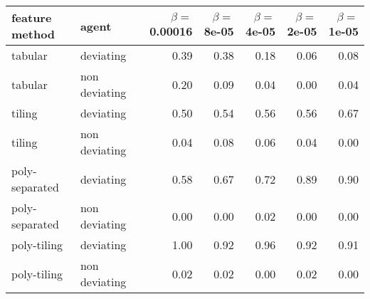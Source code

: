 \begin{tabular}{llrrrrr}
  \hline
feature method & agent & $\beta =$ 0.00016 & $\beta =$ 8e-05 & $\beta =$ 4e-05 & $\beta =$ 2e-05 & $\beta =$ 1e-05 \\ 
  \hline
tabular & deviating & 0.39 & 0.38 & 0.18 & 0.06 & 0.08 \\ 
  tabular & non deviating & 0.20 & 0.09 & 0.04 & 0.00 & 0.04 \\ 
  tiling & deviating & 0.50 & 0.54 & 0.56 & 0.56 & 0.67 \\ 
  tiling & non deviating & 0.04 & 0.08 & 0.06 & 0.04 & 0.00 \\ 
  poly-separated & deviating & 0.58 & 0.67 & 0.72 & 0.89 & 0.90 \\ 
  poly-separated & non deviating & 0.00 & 0.00 & 0.02 & 0.00 & 0.00 \\ 
  poly-tiling & deviating & 1.00 & 0.92 & 0.96 & 0.92 & 0.91 \\ 
  poly-tiling & non deviating & 0.02 & 0.02 & 0.00 & 0.02 & 0.00 \\ 
   \hline
\end{tabular}
